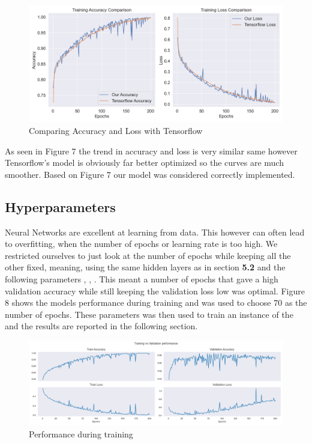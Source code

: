 \begin{figure}[ht]
    \centering
    \includegraphics[scale=0.45]{figures_for_report/tensorflow_vs_our}
    \captionsetup{justification=centering,margin=2cm}
    \caption{Comparing Accuracy and Loss with Tensorflow}
\end{figure}

As seen in Figure 7 the trend in accuracy and loss is very similar same however Tensorflow's model is obviously far better optimized so the curves are much smoother.
Based on Figure 7 our model was considered correctly implemented.

\subsection{Hyperparameters}
Neural Networks are excellent at learning from data.
This however can often lead to overfitting, when the number of epochs or learning rate is too high.
We restricted ourselves to just look at the number of epochs while keeping all the other fixed, meaning, using the same hidden layers as in section \textbf{5.2} and the following parameters
, , .
This meant a number of epochs that gave a high validation accuracy while still keeping the validation loss low was optimal.
Figure 8 shows the models performance during training and was used to choose $70$ as the number of epochs.
These parameters was then used to train an instance of the  and the results are reported in the following section.
\begin{figure}[H]
    \centering
    \includegraphics[scale=0.45]{figures_for_report/train_validation_nn_performance}
    \captionsetup{justification=centering,margin=2cm}
    \caption{Performance during training}
\end{figure}


